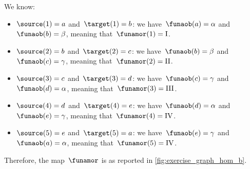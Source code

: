 \begin{solution}
    We know:
    \begin{itemize}
        \item $\source(1)=a$ and~$\target(1)=b$: we have~$\funaob(a)=\alpha$ and~$\funaob(b)=\beta$, meaning that~$\funamor(1)=\text{I}$.
        \item $\source(2)=b$ and~$\target(2)=c$: we have~$\funaob(b)=\beta$ and~$\funaob(c)=\gamma$, meaning that~$\funamor(2)=\text{II}$.
        \item $\source(3)=c$ and~$\target(3)=d$: we have~$\funaob(c)=\gamma$ and~$\funaob(d)=\alpha$, meaning that~$\funamor(3)=\text{III}$.
        \item $\source(4)=d$ and~$\target(4)=e$: we have~$\funaob(d)=\alpha$ and~$\funaob(e)=\gamma$, meaning that~$\funamor(4)=\text{IV}$.
        \item $\source(5)=e$ and~$\target(5)=a$: we have~$\funaob(e)=\gamma$ and~$\funaob(a)=\alpha$, meaning that~$\funamor(5)=\text{IV}$.
    \end{itemize}
    Therefore, the map~$\funamor$ is as reported in \cref{fig:exercise_graph_hom_b}.

    \begin{marginfigure}
        \centering
        \caption{}
        \label{fig:exercise_graph_hom_b}
    \end{marginfigure}
\end{solution}

